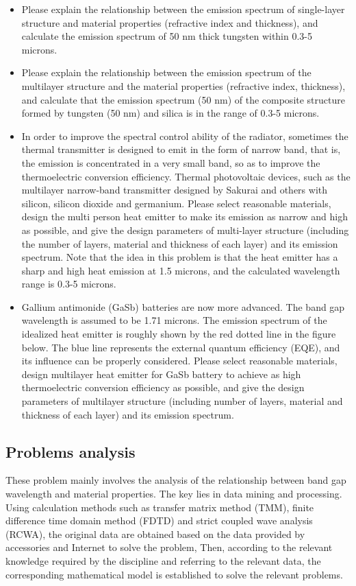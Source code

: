 \documentclass{apmcmthesis}
\begin{document}
\begin{itemize}
  \item Please explain the relationship between the emission spectrum of single-layer structure and material properties (refractive index and thickness), and calculate the emission spectrum of 50 nm thick tungsten within 0.3-5 microns.
  \item Please explain the relationship between the emission spectrum of the multilayer structure and the material properties (refractive index, thickness), and calculate that the emission spectrum (50 nm) of the composite structure formed by tungsten (50 nm) and silica is in the range of 0.3-5 microns.
  \item In order to improve the spectral control ability of the radiator, sometimes the thermal transmitter is designed to emit in the form of narrow band, that is, the emission is concentrated in a very small band, so as to improve the thermoelectric conversion efficiency. Thermal photovoltaic devices, such as the multilayer narrow-band transmitter designed by Sakurai and others with silicon, silicon dioxide and germanium. Please select reasonable materials, design the multi person heat emitter to make its emission as narrow and high as possible, and give the design parameters of multi-layer structure (including the number of layers, material and thickness of each layer) and its emission spectrum. Note that the idea in this problem is that the heat emitter has a sharp and high heat emission at 1.5 microns, and the calculated wavelength range is 0.3-5 microns.
  \item Gallium antimonide (GaSb) batteries are now more advanced. The band gap wavelength is assumed to be 1.71 microns. The emission spectrum of the idealized heat emitter is roughly shown by the red dotted line in the figure below. The blue line represents the external quantum efficiency (EQE), and its influence can be properly considered. Please select reasonable materials, design multilayer heat emitter for GaSb battery to achieve as high thermoelectric conversion efficiency as possible, and give the design parameters of multilayer structure (including number of layers, material and thickness of each layer) and its emission spectrum.

\end{itemize}

\subsection{Problems analysis}
\hspace{2em}These problem mainly involves the analysis of the relationship between band gap wavelength and material properties. The key lies in data mining and processing. Using calculation methods such as transfer matrix method (TMM), finite difference time domain method (FDTD) and strict coupled wave analysis (RCWA), the original data are obtained based on the data provided by accessories and Internet to solve the problem, Then, according to the relevant knowledge required by the discipline and referring to the relevant data, the corresponding mathematical model is established to solve the relevant problems.\par
\end{document}
